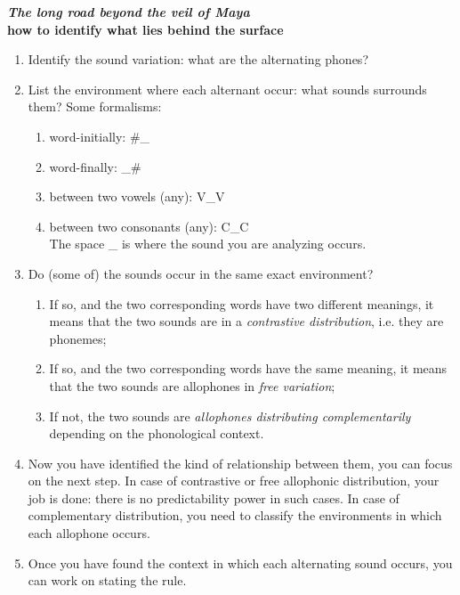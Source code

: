 \documentclass[11pt, oneside]{article}   	%
\begin{document}
\begin{tcolorbox}

\begin{center}
{\bfseries {\itshape The long road beyond the veil of Maya} \\
how to identify what lies behind the surface}
\end{center}

\begin{enumerate}
	\item Identify the sound variation: what are the alternating phones?
	\item List the environment where each alternant occur:  what sounds surrounds them? Some formalisms:
		\begin{enumerate}
			\item word-initially: \#\_
			\item word-finally: \_\#
			\item between two vowels (any): V\_V
			\item between two consonants (any): C\_C \\ The space \_ is where the sound you are analyzing occurs.
		\end{enumerate}
\item Do (some of) the sounds occur in the same exact environment?
	\begin{enumerate}
		\item If so, and the two corresponding words have two different meanings, it means that the two sounds are in a {\itshape contrastive distribution}, i.e. they are phonemes;
		\item If so, and the two corresponding words have the same meaning, it means that the two sounds are allophones in {\itshape free variation};
		\item If not, the two sounds are {\itshape allophones distributing complementarily} depending on the phonological context. 
	\end{enumerate}
\item[] Now you have identified the kind of relationship between them, you can focus on the next step. In case of contrastive or free allophonic distribution, your job is done: there is no predictability power in such cases. In case of complementary distribution, you need to classify the environments in which each allophone occurs.
\item Once you have found the context in which each alternating sound occurs, you can work on stating the rule.
	\begin{enumerate}

\end{enumerate}
\end{enumerate}
\end{tcolorbox}
\end{document}
